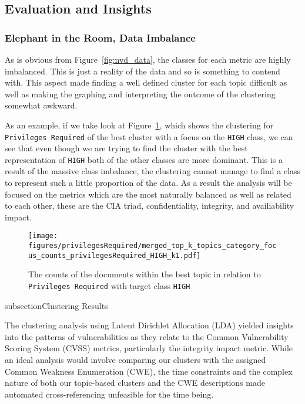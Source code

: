 \subsection{Evaluation and Insights}

\subsubsection{Elephant in the Room, Data Imbalance}

As is obvious from Figure~\ref{fig:nvd_data}, the classes for each metric are highly imbalanced. This is just a reality of the data and so is something to contend with. This aspect made finding a well defined cluster for each topic difficult as well as making the graphing and interpreting the outcome of the clustering somewhat awkward.

As an example, if we take look at Figure~\ref{fig:priviledgesRequired_BAD}, which shows the clustering for \texttt{Privileges Required}  of the best cluster with a focus on the \texttt{HIGH} class, we can see that even though we are trying to find the cluster with the best representation of \texttt{HIGH} both of the other classes are more dominant. This is a result of the massive class imbalance, the clustering cannot manage to find a class to represent such a little proportion of the data. As a result the analysis will be focused on the metrics which are the most naturally balanced as well as related to each other, these are the CIA triad, confidentiality, integrity, and availiability impact.


\begin{figure}[t]
	\begin{center}
		\texttt{[image: figures/privilegesRequired/merged\_top\_k\_topics\_category\_focus\_counts\_privilegesRequired\_HIGH\_k1.pdf]}
	\end{center}
	\caption{The counts of the documents within the best topic in relation to \texttt{Privileges Required} with
		target class \texttt{HIGH}}

	\label{fig:priviledgesRequired_BAD}
\end{figure}


subsection{Clustering Results}

The clustering analysis using Latent Dirichlet Allocation (LDA) yielded insights into the patterns of vulnerabilities as they relate to the Common Vulnerability Scoring System (CVSS) metrics, particularly the integrity impact metric. While an ideal analysis would involve comparing our clusters with the assigned Common Weakness Enumeration (CWE), the time constraints and the complex nature of both our topic-based clusters and the CWE descriptions made automated cross-referencing unfeasible for the time being.

